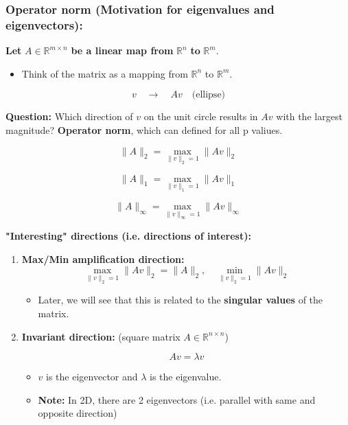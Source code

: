 \subsubsection{Operator norm (Motivation for eigenvalues and eigenvectors):}
\begin{intuition}
    \textbf{Let} $A \in \mathbb{R}^{m \times n}$ \textbf{be a linear map from} $\mathbb{R}^n$ \textbf{to} $\mathbb{R}^m$.
    \begin{itemize}
        \item Think of the matrix as a mapping from $\mathbb{R}^n$ to $\mathbb{R}^m$.
    \end{itemize}

    \[
    v \quad \longrightarrow \quad Av \quad \text{(ellipse)}
    \]


    \textbf{Question:} Which direction of $v$ on the unit circle results in $Av$ with the largest magnitude? \textbf{Operator norm}, which can defined for all p valiues.

    \[
    \|A\|_2 = \max_{\|v\|_2 = 1} \|Av\|_2 
    \]

    \[
    \|A\|_1 = \max_{\|v\|_1 = 1} \|Av\|_1
    \]

    \[
    \|A\|_\infty = \max_{\|v\|_\infty = 1} \|Av\|_\infty
    \]

    \textbf{"Interesting" directions (i.e. directions of interest):}
    \begin{enumerate}
        \item  \textbf{Max/Min amplification direction:}
        \[
        \max_{\|v\|_2 = 1} \|Av\|_2 = \|A\|_2, \quad \min_{\|v\|_2 = 1} \|Av\|_2
        \]
        \begin{itemize}
            \item Later, we will see that this is related to the \textbf{singular values} of the matrix.
        \end{itemize}
    
        \item \textbf{Invariant direction:} (square matrix $A \in \mathbb{R}^{n \times n}$)
    
        \[
        A v = \lambda v
        \]
        \begin{itemize}
            \item $v$ is the eigenvector and $\lambda$ is the eigenvalue.
            \item \textbf{Note:} In 2D, there are 2 eigenvectors (i.e. parallel with same and opposite direction)
        \end{itemize}
    \end{enumerate}
\end{intuition}

